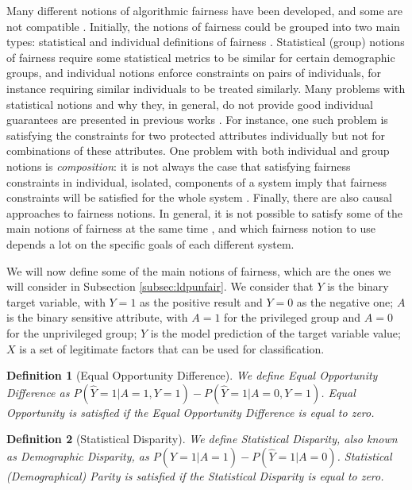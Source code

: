 \documentclass[conference]{IEEEtran}
\newtheorem{definition}{Definition}
\begin{document}
Many different notions of algorithmic fairness have been developed, and some are not compatible \cite{alves2023survey}. Initially, the notions of fairness could be grouped into two main types: statistical and individual definitions of fairness \cite{chouldechova2018frontiers}. Statistical (group) notions of fairness require some statistical metrics to be similar for certain demographic groups, and individual notions enforce constraints on pairs of individuals, for instance requiring similar individuals to be treated similarly. Many problems with statistical notions and why they, in general, do not provide good individual guarantees are presented in previous works \cite{Awareness}\cite{kearns2018preventing}. For instance, one such problem is satisfying the constraints for two protected attributes individually but not for combinations of these attributes. One problem with both individual and group notions is \emph{composition}: it is not always the case that satisfying fairness constraints in individual, isolated, components of a system imply that fairness constraints will be satisfied for the whole system \cite{dwork2018fairness}. Finally, there are also causal approaches to fairness notions. In general, it is not possible to satisfy some of the main notions of fairness at the same time \cite{hellman2020measuring}\cite{bell2023possibility}\cite{zemel2013learning}, and which fairness notion to use depends a lot on the specific goals of each different system.

We will now define some of the main notions of fairness, which are the ones we will consider in Subsection \ref{subsec:ldpunfair}. We consider that $Y$ is the binary target variable, with $Y=1$ as the positive result and $Y=0$ as the negative one; $A$ is the binary sensitive attribute, with $A=1$ for the privileged group and $A=0$ for the unprivileged group; $\hat Y$ is the model prediction of the target variable value; $X$ is a set of legitimate factors that can be used for classification.

\begin{definition}[Equal Opportunity Difference]\label{def:EOD} We define \emph{Equal Opportunity Difference} as $P(\hat Y = 1| A = 1, Y =1) - P(\hat Y = 1| A = 0, Y = 1)$. Equal Opportunity is \emph{satisfied} if the Equal Opportunity Difference is equal to zero.
\end{definition}

\begin{definition}[Statistical Disparity]\label{def:SD} We define \emph{Statistical Disparity}, also known as \emph{Demographic Disparity}, as $P(\hat Y = 1| A = 1) - P(\hat Y = 1| A = 0)$. Statistical (Demographical) \emph{Parity} is \emph{satisfied} if the Statistical Disparity is equal to zero.
\end{definition}
\end{document}
